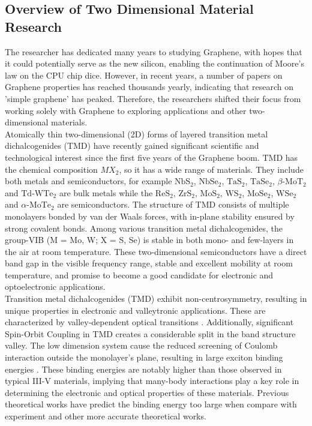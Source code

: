 \documentclass[12pt,english,a4paper]{article}
\begin{document}
	\subsection{Overview of Two Dimensional Material Research}
	\quad  The researcher has dedicated many years to studying Graphene, with hopes that it could potentially serve as the new silicon, enabling the continuation of Moore's law on the CPU chip dice. However, in recent years, a number of papers on Graphene properties has reached thousands yearly, indicating that research on 'simple graphene' has peaked. \cite{geim_van_2013} Therefore, the researchers shifted their focus from working solely with Graphene to exploring applications and other two-dimensional materials.\\\null
	\quad Atomically thin two-dimensional (2D) forms of layered transition metal dichalcogenides (TMD) have recently gained significant scientific and technological interest since the first five years of the Graphene boom.\cite{wang_electronics_2012,geim_van_2013} TMD has the chemical composition $MX_2$, so it has a wide range of materials. They include both metals and semiconductors, for example $\mathrm{NbS}_2$, $\mathrm{NbSe}_2$, $\mathrm{TaS}_2$, $\mathrm{TaSe}_2$, $\beta$-$\mathrm{MoT}_2$ and $\mathrm{Td}$-$\mathrm{WTe}_2$ are bulk metals while the $\mathrm{ReS}_2$, $\mathrm{ZrS}_2$, $\mathrm{MoS}_2$, $\mathrm{WS}_2$, $\mathrm{MoSe}_2$, $\mathrm{WSe}_2$ and $\alpha$-$\mathrm{MoTe}_2$ are semiconductors. The structure of TMD consists of multiple monolayers bonded by van der Waals forces, with in-plane stability ensured by strong covalent bonds.
	Among various transition metal dichalcogenides, the group-VIB (M = Mo, W; X = S, Se) is stable in both mono- and few-layers in the air at room temperature.\cite{geim_van_2013} These two-dimensional semiconductors have a direct band gap in the visible frequency range, stable and excellent mobility at room temperature\cite{jiang_flexo-photovoltaic_2021, wang_electronics_2012}, and promise to become a good candidate for electronic and optoelectronic applications.\\\null
	\quad Transition metal dichalcogenides (TMD) exhibit non-centrosymmetry, resulting in unique properties in electronic and valleytronic applications. These are characterized by valley-dependent optical transitions \cite{xiao_valley-contrasting_2007,yao_valley-dependent_2008}. Additionally, significant Spin-Orbit Coupling in TMD creates a considerable split in the band structure valley. The low dimension system cause the reduced screening of Coulomb interaction outside the monolayer's plane, resulting in large exciton binding energies \cite{kirichenko_influence_2021, zhang_absorption_2014}. These binding energies are notably higher than those observed in typical III-V materials, implying that many-body interactions play a key role in determining the electronic and optical properties of these materials. Previous theoretical works have predict the binding energy too large\cite{ramasubramaniam_large_2012,qiu_optical_2013,cheiwchanchamnangij_quasiparticle_2012, shi_quasiparticle_2013} when compare with experiment\cite{zhang_absorption_2014} and other more accurate theoretical works\cite{zhang_absorption_2014, kirichenko_influence_2021}.
\end{document}
